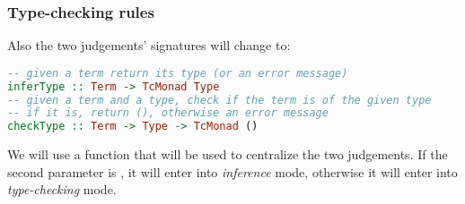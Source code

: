 \subsubsection{Type-checking rules}
Also the two judgements' signatures will change to:

\begin{lstlisting}[language=Haskell]
-- given a term return its type (or an error message)
inferType :: Term -> TcMonad Type
-- given a term and a type, check if the term is of the given type
-- if it is, return (), otherwise an error message
checkType :: Term -> Type -> TcMonad ()
\end{lstlisting}

We will use a  function that will be used to centralize the two judgements. If the second parameter is , it will enter into \emph{inference} mode, otherwise it will enter into \emph{type-checking} mode.

